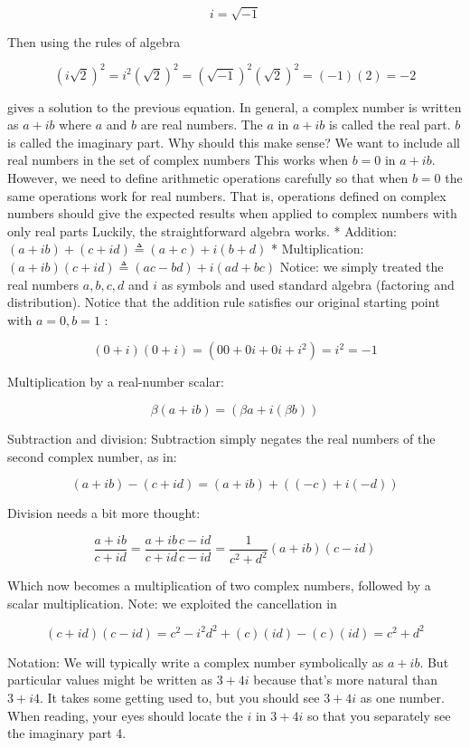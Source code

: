 \documentclass[main.tex]{subfiles}
\begin{document}
    $$i=\sqrt{-1}$$
    
    Then using the rules of algebra
    
    $$(i \sqrt{2})^{2}=i^{2}(\sqrt{2})^{2}=(\sqrt{-1})^{2}(\sqrt{2})^{2}=(-1)(2)=-2$$
    
    gives a solution to the previous equation. In general, a complex number is written as $a+i b$ where $a$ and $b$ are real numbers. The $a$ in $a+i b$ is called the real part. $b$ is called the imaginary part. Why should this make sense? We want to include all real numbers in the set of complex numbers This works when $b=0$ in $a+i b$. However, we need to define arithmetic operations carefully so that when $b=0$ the same operations work for real numbers. That is, operations defined on complex numbers should give the expected results when applied to complex numbers with only real parts Luckily, the straightforward algebra works.
    * Addition: $(a+i b)+(c+i d) \triangleq(a+c)+i(b+d)$
    * Multiplication: $(a+i b)(c+i d) \triangleq(a c-b d)+i(a d+b c)$
    Notice: we simply treated the real numbers $a, b, c, d$ and $i$ as symbols and used standard algebra (factoring and distribution). Notice that the addition rule satisfies our original starting point with $a=0, b=1$ :
    
    $$(0+i)(0+i)=\left(00+0 i+0 i+i^{2}\right)=i^{2}=-1$$
    
    Multiplication by a real-number scalar:
    
    $$\beta(a+i b)=(\beta a+i(\beta b))$$
    
    Subtraction and division: Subtraction simply negates the real numbers of the second complex number, as in:
    
    $$(a+i b)-(c+i d)=(a+i b)+((-c)+i(-d))$$
    
    Division needs a bit more thought:
    
    $$\frac{a+i b}{c+i d}=\frac{a+i b}{c+i d} \frac{c-i d}{c-i d}=\frac{1}{c^{2}+d^{2}}(a+i b)(c-i d)$$

    Which now becomes a multiplication of two complex numbers, followed by a scalar multiplication. Note: we exploited the cancellation in
    
    $$(c+i d)(c-i d)=c^{2}-i^{2} d^{2}+(c)(i d)-(c)(i d)=c^{2}+d^{2}$$ 

    Notation: We will typically write a complex number symbolically as $a+i b$. But particular values might be written as $3+4 i$ because that's more natural than $3+i 4$. It takes some getting used to, but you should see $3+4 i$ as one number. When reading, your eyes should locate the $i$ in $3+4 i$ so that you separately see the imaginary part 4.\\
    
\end{document}
